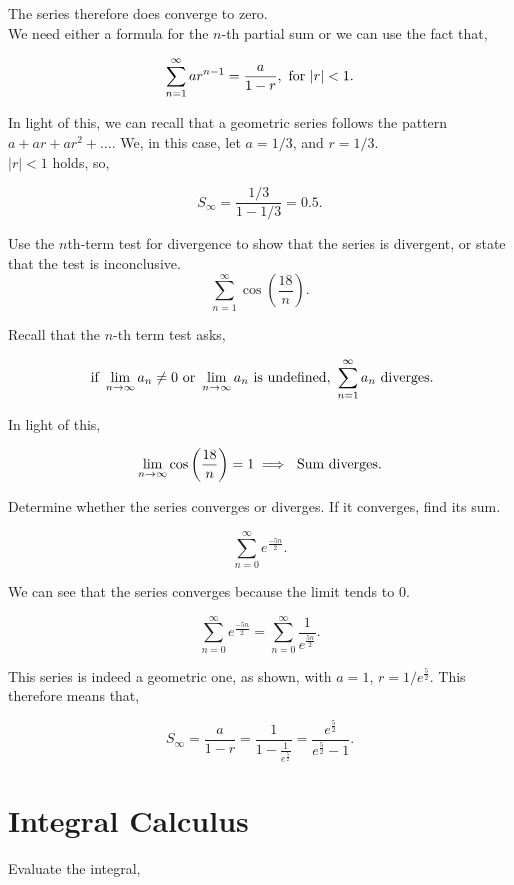 \documentclass{article}
\begin{document}
            The series therefore does converge to zero. \xmark\\

            \rans We need either a formula for the $n$-th partial sum or we can use the fact that,

            \[\sum_{n = 1}^{\infty}ar^{n-1} = \frac{a}{1 - r},\text{ for } |r| < 1.\]

            In light of this, we can recall that a geometric series follows the pattern $a + ar + ar^2 + \dots$. We, in this case, let $a = 1/3$, and $r = 1/3$.\\

            $|r|< 1$ holds, so,

            \[S_{\infty} = \frac{1/3}{1 - 1/3} = 0.5.\]

            Use the $n$th-term test for divergence to show that the series is divergent, or state that the test is inconclusive.\\

            \[\sum_{n = 1}^{\infty} \cos \left( \frac{18}{n} \right).\]

            \ans Recall that the $n$-th term test asks,

            \[\text{ if } \lim_{n\rightarrow\infty} a_n \neq 0 \text{ or } \lim_{n\rightarrow\infty}a_n \text{ is undefined},~ \sum_{n = 1}^{\infty}a_n \text{ diverges}.\]

            In light of this, 

            \[\lim_{n\rightarrow\infty} \cos \left( \frac{18}{n} \right) = 1 \implies \text{ Sum diverges}.\]

            Determine whether the series converges or diverges. If it converges, find its sum.

            \[\sum_{n = 0}^{\infty}e^{\frac{-5n}{2}}.\]

            \ans We can see that the series converges because the limit tends to 0. 

            \[\sum_{n = 0}^{\infty}e^{\frac{-5n}{2}} = \sum_{n = 0}^{\infty} \frac{1}{e^{\frac{5n}{2}}}.\]
            
            This series is indeed a geometric one, as shown, with $a = 1$, $r = 1/e^{\frac{5}{2}}$. This therefore means that,

            \[S_{\infty} = \frac{a}{1 - r} = \frac{1}{1 - \frac{1}{e^{\frac{5}{2}}}} = \frac{e^{\frac{5}{2}}}{e^{\frac{5}{2}} - 1}.\]


    \section{Integral Calculus}
            Evaluate the integral,
\end{document}
